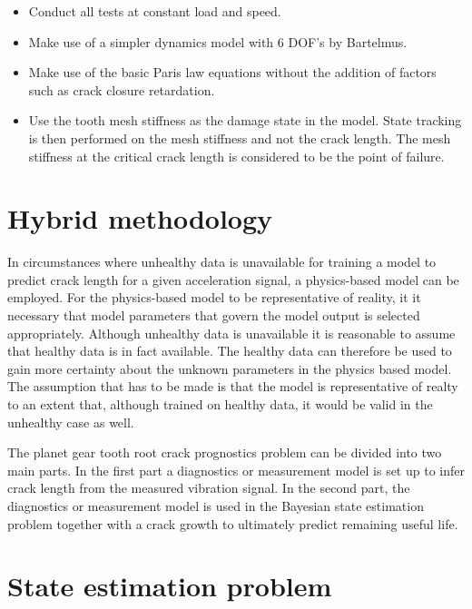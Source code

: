 \begin{itemize}
	\item Conduct all tests at constant load and speed.
	\item Make use of a simpler dynamics model with 6 DOF's by Bartelmus. 
	\item Make use of the basic Paris law equations without the addition of factors such as crack closure retardation. 
	\item Use the tooth mesh stiffness as the damage state in the model. State tracking is then performed on the mesh stiffness and not the crack length. The mesh stiffness at the critical crack length is considered to be the point of failure.
\end{itemize}


\section{Hybrid methodology}
In circumstances where unhealthy data is unavailable for training a model to predict crack length for a given acceleration signal, a physics-based model can be employed. For the physics-based model to be representative of reality, it it necessary that model parameters that govern the model output is selected appropriately. Although unhealthy data is unavailable it is reasonable to assume that healthy data is in fact available. The healthy data can therefore be used to gain more certainty about the unknown parameters in the physics based model. The assumption that has to be made is that the model is representative of realty to an extent that, although trained on healthy data, it would be valid in the unhealthy case as well. 

The planet gear tooth root crack prognostics problem can be divided into two main parts. In the first part a diagnostics or measurement model is set up to infer crack length from the measured vibration signal. In the second part, the diagnostics or measurement model is used in the Bayesian state estimation problem together with a crack growth to ultimately predict remaining useful life. 





\section{State estimation problem}

